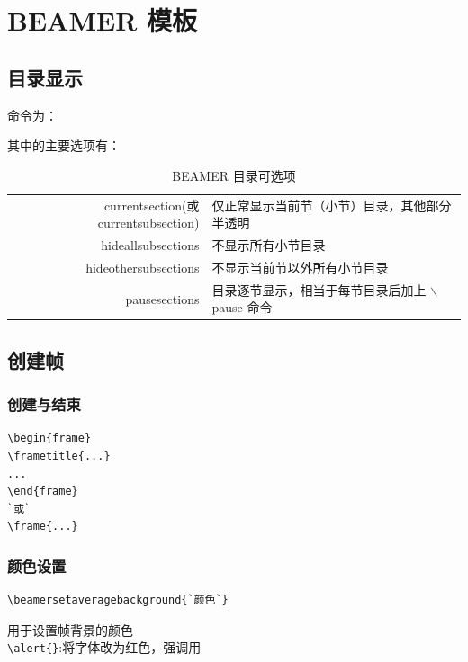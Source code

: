 \section{BEAMER 模板}

\subsection{目录显示}

命令为：\\

其中的主要选项有：\\

\begin{table}[htbp]
  \centering
  \caption{BEAMER 目录可选项}\label{contents}
\begin{tabularx}{14cm}{rX}
\toprule
  currentsection(或 currentsubsection) & 仅正常显示当前节（小节）目录，其他部分半透明 \\
  hideallsubsections & 不显示所有小节目录 \\
  hideothersubsections & 不显示当前节以外所有小节目录 \\
pausesections& 目录逐节显示，相当于每节目录后加上 $\backslash$pause 命令 \\
\bottomrule
\end{tabularx}
\end{table}

\subsection{创建帧}

\subsubsection{创建与结束}
\begin{lstlisting}[language={[LaTeX]TeX}]
\begin{frame}
\frametitle{...}
...
\end{frame}
`或`
\frame{...}
\end{lstlisting}

\subsubsection{颜色设置}

\begin{lstlisting}[language={[LaTeX]TeX}]
\beamersetaveragebackground{`颜色`}
\end{lstlisting}
用于设置帧背景的颜色\\
\verb$\alert{}$:将字体改为红色，强调用\\

